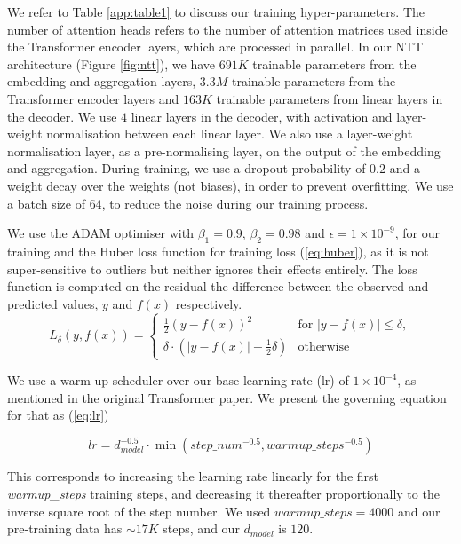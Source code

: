 We refer to Table \ref{app:table1} to discuss our training hyper-parameters. The number of attention heads refers to the number of attention matrices used inside the Transformer encoder layers, which are processed in parallel. In our NTT architecture (Figure \ref{fig:ntt}), we have $691K$ trainable parameters from the embedding and aggregation layers, $3.3M$ trainable parameters from the Transformer encoder layers and $163K$ trainable parameters from linear layers in the decoder. We use $4$ linear layers in the decoder, with activation and layer-weight normalisation\cite{layernorm} between each linear layer.  We also use a layer-weight normalisation layer, as a pre-normalising layer, on the output of the embedding and aggregation. During training, we use a dropout probability\cite{dropout} of $0.2$ and a weight decay\cite{weightdecay} over the weights (not biases), in order to prevent overfitting. We use a batch size of $64$, to reduce the noise during our training process.

We use the ADAM\cite{adam} optimiser with $\beta_1=0.9$, $\beta_2=0.98$ and $\epsilon=1\times10^{-9}$, for our training and the Huber loss\cite{huber} function for training loss (\ref{eq:huber}), as it is not super-sensitive to outliers but neither ignores their effects entirely. The loss function is computed on the residual \ie the difference between the observed  and predicted values, $y$ and $f(x)$ respectively.
\begin{equation}
L_\delta(y, f(x))=
    \begin{cases}
        \frac{1}{2}(y - f(x))^2 & \text{for } \lvert y - f(x) \rvert \leq \delta, \\
        \delta  \cdot (\lvert y - f(x) \rvert - \frac{1}{2}\delta) & \text{otherwise}
    \end{cases}
\label{eq:huber}
\end{equation}

We use a warm-up scheduler over our base learning rate (lr) of  $1\times10^{-4}$, as mentioned in the original Transformer paper\cite{vaswaniAttentionAllYou2017}. We present the governing equation for that as (\ref {eq:lr})

\begin{equation}
lr = d_{model}^{-0.5} \cdot \min{(step\_num^{-0.5}, warmup\_steps^{-0.5})}
\label{eq:lr}
\end{equation}

This corresponds to increasing the learning rate linearly for the first \emph{warmup\_steps} training steps, and decreasing it thereafter proportionally to the inverse square root of the step number. We used $warmup\_steps = 4000$ and our pre-training data has ${\sim}17K$ steps, and our $d_{model}$ is $120$.


